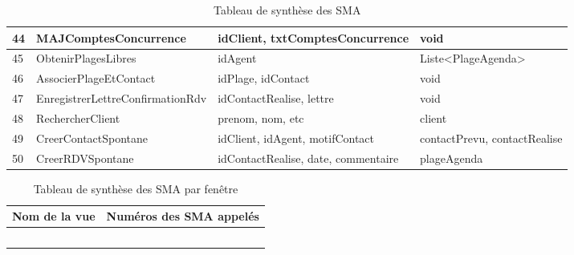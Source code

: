 \begin{table}
{\begin{tabular}{p{1cm}|p{5cm}p{6cm}p{6cm}}
        44 & MAJComptesConcurrence              & idClient, txtComptesConcurrence                               & void \\ \hline
        45 & ObtenirPlagesLibres                & idAgent                                                       & Liste<PlageAgenda>\\ \hline
        46 & AssocierPlageEtContact             & idPlage, idContact                                            & void\\ \hline
        47 & EnregistrerLettreConfirmationRdv   & idContactRealise, lettre                                      & void\\ \hline
        48 & RechercherClient                   & prenom, nom, etc                                              & client\\ \hline
        49 & CreerContactSpontane               & idClient, idAgent, motifContact                               & contactPrevu, contactRealise\\ \hline
        50 & CreerRDVSpontane                   & idContactRealise, date, commentaire                           & plageAgenda\\ 
        \end{tabular}
        }
        \caption{Tableau de synthèse des SMA}
\end{table}

\begin{table}
    \centering
    \begin{tabular}{l|l}
    Nom de la vue   & Numéros des SMA appelés   \\ \hline
    ~               & ~                         \\ 
    \end{tabular}
    \caption{Tableau de synthèse des SMA par fenêtre}
\end{table}


